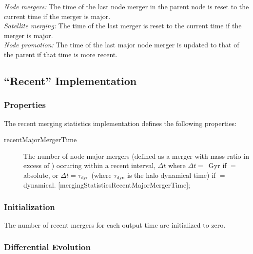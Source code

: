 \noindent\emph{Node mergers:} The time of the last \gls{node} merger in the parent \gls{node} is reset to the current time if the merger is major.\\

\noindent\emph{Satellite merging:} The time of the last merger is reset to the current time if the merger is major.\\

\noindent\emph{Node promotion:} The time of the last major \gls{node} merger is updated to that of the parent if that time is more recent.\\

\subsection{``Recent'' Implementation}

\subsubsection{Properties}

The recent merging statistics implementation defines the following properties:
\begin{description}
 \item [{\normalfont \ttfamily recentMajorMergerTime}] The number of node major mergers (defined as a merger with mass ratio in excess of {\normalfont \ttfamily [nodeMajorMergerFraction]}) occuring within a recent interval, $\Delta t$ where $\Delta t = ${\normalfont \ttfamily [nodeRecentMajorMergerInterval]}~Gyr if {\normalfont \ttfamily [nodeRecentMajorMergerIntervalType]}$=${\normalfont \ttfamily absolute}, or $\Delta t = ${\normalfont \ttfamily [nodeRecentMajorMergerInterval]}$\tau_\mathrm{dyn}$ (where $\tau_\mathrm{dyn}$ is the halo dynamical time) if {\normalfont \ttfamily [nodeRecentMajorMergerIntervalType]}$=${\normalfont \ttfamily dynamical}. [{\normalfont \ttfamily mergingStatisticsRecentMajorMergerTime}];
\end{description}

\subsubsection{Initialization}

The number of recent mergers for each output time are initialized to zero.

\subsubsection{Differential Evolution}

